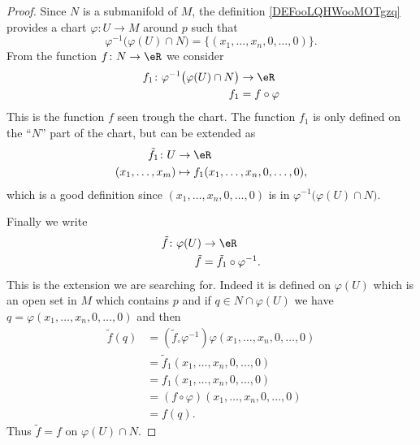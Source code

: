\begin{proof}
    Since \( N\) is a submanifold of \( M\), the definition \ref{DEFooLQHWooMOTgzq} provides a chart \( \varphi\colon U\to M\) around \( p\) such that 
    \begin{equation}
        \varphi^{-1}\big( \varphi(U)\cap N \big)=\{ (x_1,\ldots, x_n,0,\ldots, 0) \}.
    \end{equation}
    From the function \( f\colon N\to \eR\) we consider 
    \begin{equation}
        \begin{aligned}
            f_1\colon \varphi^{-1}\big( \varphi(U)\cap N \big)&\to \eR \\
            f_1&=f\circ\varphi
        \end{aligned}
    \end{equation}
    This is the function \( f\) seen trough the chart. The function \( f_1\) is only defined on the ``\( N\)'' part of the chart, but can be extended as
    \begin{equation}
        \begin{aligned}
            \tilde f_1\colon U&\to \eR \\
            (x_1,\ldots, x_m)&\mapsto f_1(x_1,\ldots, x_n,0,\ldots, 0), 
        \end{aligned}
    \end{equation}
    which is a good definition since \( (x_1,\ldots, x_n,0,\ldots, 0)\) is in \( \varphi^{-1}\big( \varphi(U)\cap N \big)\).

    Finally we write
    \begin{equation}
        \begin{aligned}
            \tilde f\colon \varphi(U)&\to \eR \\
            \tilde f&=\tilde f_1\circ\varphi^{-1}.
        \end{aligned}
    \end{equation}
    This is the extension we are searching for. Indeed it is defined on \( \varphi(U)\) which is an open set in \( M\) which contains \( p\) and if \( q\in N\cap\varphi(U)\) we have \( q=\varphi(x_1,\ldots, x_n,0,\ldots, 0)\) and then
    \begin{subequations}
        \begin{align}
            \tilde f(q)&=(\tilde f_\circ\varphi^{-1})\varphi(x_1,\ldots, x_n,0,\ldots, 0)\\
            &=\tilde f_1(x_1,\ldots, x_n,0,\ldots, 0)\\
            &=f_1(x_1,\ldots, x_n,0,\ldots, 0)\\
            &=(f\circ\varphi)(x_1,\ldots, x_n,0,\ldots, 0)\\
            &=f(q).
        \end{align}
    \end{subequations}
    Thus \( \tilde f=f\) on \( \varphi(U)\cap N\).
\end{proof}
